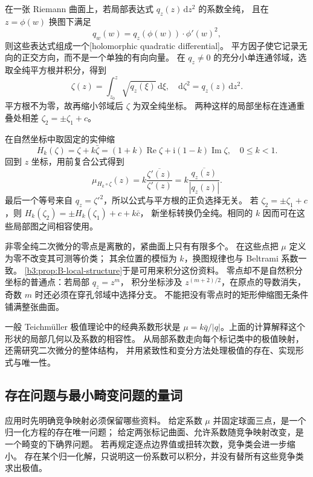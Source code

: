 在一张 Riemann 曲面上，若局部表达式 \(q_z(z)\,\mathrm dz^2\) 的系数全纯，
且在 \(z=\phi(w)\) 换图下满足
\[
 q_w(w)=q_z(\phi(w))\cdot\phi'(w)^2,
\]
则这些表达式组成一个[holomorphic quadratic differential]。
平方因子使它记录无向的正交方向，而不是一个单独的有向向量。
在 \(q_z\ne0\) 的充分小单连通邻域，选取全纯平方根并积分，得到
\[
 \zeta(z)=\int_{z_0}^{z}\sqrt{q_z(\xi)}\,\mathrm d\xi,
 \quad \mathrm d\zeta^2=q_z(z)\,\mathrm dz^2.
\]
平方根不为零，故再缩小邻域后 \(\zeta\) 为双全纯坐标。
两种这样的局部坐标在连通重叠处相差 \(\zeta_2=\pm\zeta_1+c\)。

\ProseParagraphBreak

在自然坐标中取固定的实伸缩
\[
 H_k(\zeta)=\zeta+k\bar\zeta
          =(1+k)\operatorname{Re}\zeta
             +\mathrm i(1-k)\operatorname{Im}\zeta,
 \quad 0\le k<1.
\]
回到 \(z\) 坐标，用前复合公式得到
\[
 \mu_{H_k\circ\zeta}(z)
 =k\frac{\overline{\zeta'(z)}}{\zeta'(z)}
 =k\frac{\overline{q_z(z)}}{|q_z(z)|}.
\]
最后一个等号来自 \(q_z=\zeta'^2\)，所以公式与平方根的正负选择无关。
若 \(\zeta_2=\pm\zeta_1+c\)，则
\(H_k(\zeta_2)=\pm H_k(\zeta_1)+c+k\bar c\)，
新坐标转换仍全纯。相同的 \(k\) 因而可在这些局部图之间相容使用。

\ProseParagraphBreak

非零全纯二次微分的零点是离散的，紧曲面上只有有限多个。
在这些点把 \(\mu\) 定义为零不改变其可测等价类；
其余位置的模恒为 \(k\)，换图规律也与 Beltrami 系数一致。
\cref{b3:prop:B-local-structure}于是可用来积分这份资料。
零点却不是自然积分坐标的普通点：若局部 \(q_z=z^m\)，
积分坐标涉及 \(z^{(m+2)/2}\)，在原点的导数消失，
奇数 \(m\) 时还必须在穿孔邻域中选择分支。
不能把没有零点时的矩形伸缩图无条件铺满整张曲面。

\ProseParagraphBreak

一般 Teichmüller 极值理论中的经典系数形状是
\(\mu=k\bar q/|q|\)。上面的计算解释这个形状的局部几何以及系数的相容性。
从局部系数走向每个标记类中的极值映射，还需研究二次微分的整体结构，
并用紧致性和变分方法处理极值的存在、实现形式与唯一性。

\subsection{存在问题与最小畸变问题的量词}
\label{b3:subsec:B0603}

应用时先明确竞争映射必须保留哪些资料。
给定系数 \(\mu\) 并固定球面三点，是一个归一化方程的存在唯一问题；
给定两张标记曲面、允许系数随竞争映射改变，是一个畸变的下确界问题。
若再规定逐点边界值或扭转次数，竞争类会进一步缩小。
存在某个归一化解，只说明这一份系数可以积分，并没有替所有这些竞争类求出极值。

